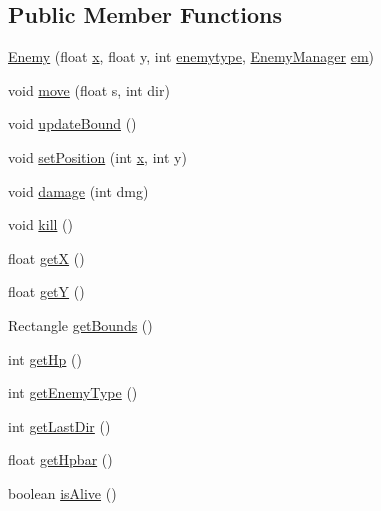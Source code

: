 \subsection*{Public Member Functions}
\begin{DoxyCompactItemize}
\item 
\hyperlink{classenemies_1_1_enemy_afa298133293bebcdafef5956df1d1911}{Enemy} (float \hyperlink{classenemies_1_1_enemy_ad0da36b2558901e21e7a30f6c227a45e}{x}, float y, int \hyperlink{classenemies_1_1_enemy_aac2aa7795cecac1072a281ed3b323443}{enemytype}, \hyperlink{classmanagers_1_1_enemy_manager}{Enemy\+Manager} \hyperlink{classenemies_1_1_enemy_ae3966a6508c5a21dafa875aebfee1dfe}{em})
\item 
void \hyperlink{classenemies_1_1_enemy_a474fd9bb876d55f65850132777c539d8}{move} (float s, int dir)
\item 
void \hyperlink{classenemies_1_1_enemy_aff695491d98058a8b62a30d4484083bc}{update\+Bound} ()
\item 
void \hyperlink{classenemies_1_1_enemy_ad6c107fadf835c74a229f8cac0cc98ab}{set\+Position} (int \hyperlink{classenemies_1_1_enemy_ad0da36b2558901e21e7a30f6c227a45e}{x}, int y)
\item 
void \hyperlink{classenemies_1_1_enemy_ab316db3306dfd12457e3df71e933ca2d}{damage} (int dmg)
\item 
void \hyperlink{classenemies_1_1_enemy_aae9d52caad9fb2892deeb25596cfd2ab}{kill} ()
\item 
float \hyperlink{classenemies_1_1_enemy_ae8f033a71b96920114aee202798dc7e9}{getX} ()
\item 
float \hyperlink{classenemies_1_1_enemy_aa0f539cec219900ff6cf76edcfa52367}{getY} ()
\item 
Rectangle \hyperlink{classenemies_1_1_enemy_a187945475e730bfa340a10f63224e91f}{get\+Bounds} ()
\item 
int \hyperlink{classenemies_1_1_enemy_a36ea7ddac664afde3e9f5e5f841855ee}{get\+Hp} ()
\item 
int \hyperlink{classenemies_1_1_enemy_a40aced6dca930a3ae575a42b3286e230}{get\+Enemy\+Type} ()
\item 
int \hyperlink{classenemies_1_1_enemy_a1927b6b5c678c91bde7bfe83531c9a2d}{get\+Last\+Dir} ()
\item 
float \hyperlink{classenemies_1_1_enemy_a719baea5da89286e1c263e1beb3ee35d}{get\+Hpbar} ()
\item 
boolean \hyperlink{classenemies_1_1_enemy_ab63593ba1faf08d9f9d69e1ec33c3caf}{is\+Alive} ()
\end{DoxyCompactItemize}
